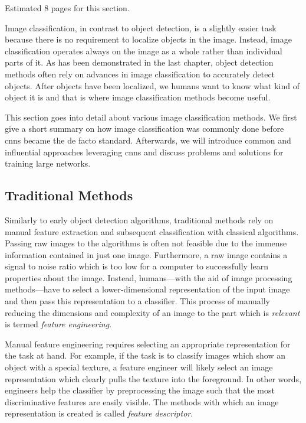 \documentclass[draft,final]{vutinfth} %
\begin{document}
Estimated 8 pages for this section.

Image classification, in contrast to object detection, is a slightly
easier task because there is no requirement to localize objects in the
image. Instead, image classification operates always on the image as a
whole rather than individual parts of it. As has been demonstrated in
the last chapter, object detection methods often rely on advances in
image classification to accurately detect objects. After objects have
been localized, we humans want to know what kind of object it is and
that is where image classification methods become useful.

This section goes into detail about various image classification
methods. We first give a short summary on how image classification was
commonly done before \glspl{cnn} became the de facto
standard. Afterwards, we will introduce common and influential
approaches leveraging \glspl{cnn} and discuss problems and solutions
for training large networks.

\subsection{Traditional Methods}
\label{ssec:class-traditional}

Similarly to early object detection algorithms, traditional methods
rely on manual feature extraction and subsequent classification with
classical algorithms. Passing raw images to the algorithms is often
not feasible due to the immense information contained in just one
image. Furthermore, a raw image contains a signal to noise ratio which
is too low for a computer to successfully learn properties about the
image. Instead, humans—with the aid of image processing methods—have
to select a lower-dimensional representation of the input image and
then pass this representation to a classifier. This process of
manually reducing the dimensions and complexity of an image to the
part which is \emph{relevant} is termed \emph{feature engineering}.

Manual feature engineering requires selecting an appropriate
representation for the task at hand. For example, if the task is to
classify images which show an object with a special texture, a feature
engineer will likely select an image representation which clearly
pulls the texture into the foreground. In other words, engineers help
the classifier by preprocessing the image such that the most
discriminative features are easily visible. The methods with which an
image representation is created is called \emph{feature descriptor}.
\end{document}
